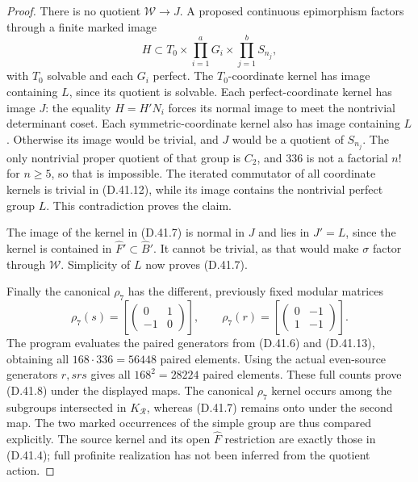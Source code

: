 \begin{proof}
There is no quotient $\mathcal W\to J$.
A proposed continuous epimorphism factors
through a finite marked image
\[
 H\subset T_0\times\prod_{i=1}^a G_i
                       \times\prod_{j=1}^b S_{n_j},
                                                               \tag{D.41.12}
\]
with $T_0$ solvable and each $G_i$ perfect.
The $T_0$-coordinate kernel has image containing
$L$, since its quotient is solvable.
Each perfect-coordinate kernel has image
$J$: the equality $H=H'N_i$ forces its normal
image to meet the nontrivial determinant
coset. Each symmetric-coordinate kernel
also has image containing $L$. Otherwise
its image would be trivial, and $J$ would
be a quotient of $S_{n_j}$. The only
nontrivial proper quotient of that group
is $C_2$, and $336$ is not a factorial
$n!$ for $n\ge5$, so that is impossible.
The iterated commutator of all coordinate
kernels is trivial in (D.41.12), while its
image contains the nontrivial perfect
group $L$. This contradiction proves the claim.

The image of the kernel in (D.41.7) is normal
in $J$ and lies in $J'=L$, since the kernel
is contained in $\widehat F'\subset\widehat B'$.
It cannot be trivial, as that would make
$\sigma$ factor through $\mathcal W$.
Simplicity of $L$ now proves (D.41.7).

Finally the canonical $\rho_7$ has the
different, previously fixed modular matrices
\[
 \rho_7(s)=
 \left[\begin{pmatrix}0&1\\-1&0\end{pmatrix}\right],
 \qquad
 \rho_7(r)=
 \left[\begin{pmatrix}0&-1\\1&-1\end{pmatrix}\right].
                                                               \tag{D.41.13}
\]
The program evaluates the paired generators
from (D.41.6) and (D.41.13), obtaining all
$168\cdot336=56448$ paired elements.
Using the actual even-source generators
$r,srs$ gives all $168^2=28224$ paired
elements. These full counts prove
(D.41.8) under the displayed maps.
The canonical $\rho_7$ kernel occurs among the
subgroups intersected in $K_{\mathcal R}$,
whereas (D.41.7) remains
onto under the second map. The two marked
occurrences of the simple group are thus
compared explicitly. The source kernel and
its open $\widehat F$ restriction are exactly
those in (D.41.4); full profinite realization
has not been inferred from the quotient action.
\end{proof}
